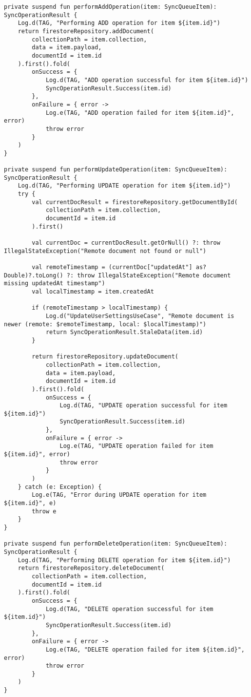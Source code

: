 \begin{lstlisting}[caption=Operazioni di Sincronizzazione, label=lst:sync_operations, basicstyle=\ttfamily\scriptsize, breaklines=true, breakatwhitespace=true, tabsize=4]
private suspend fun performAddOperation(item: SyncQueueItem): SyncOperationResult {
    Log.d(TAG, "Performing ADD operation for item ${item.id}")
    return firestoreRepository.addDocument(
        collectionPath = item.collection,
        data = item.payload,
        documentId = item.id
    ).first().fold(
        onSuccess = {
            Log.d(TAG, "ADD operation successful for item ${item.id}")
            SyncOperationResult.Success(item.id)
        },
        onFailure = { error ->
            Log.e(TAG, "ADD operation failed for item ${item.id}", error)
            throw error
        }
    )
}

private suspend fun performUpdateOperation(item: SyncQueueItem): SyncOperationResult {
    Log.d(TAG, "Performing UPDATE operation for item ${item.id}")
    try {
        val currentDocResult = firestoreRepository.getDocumentById(
            collectionPath = item.collection,
            documentId = item.id
        ).first()

        val currentDoc = currentDocResult.getOrNull() ?: throw IllegalStateException("Remote document not found or null")

        val remoteTimestamp = (currentDoc["updatedAt"] as? Double)?.toLong() ?: throw IllegalStateException("Remote document missing updatedAt timestamp")
        val localTimestamp = item.createdAt

        if (remoteTimestamp > localTimestamp) {
            Log.d("UpdateUserSettingsUseCase", "Remote document is newer (remote: $remoteTimestamp, local: $localTimestamp)")
            return SyncOperationResult.StaleData(item.id)
        }

        return firestoreRepository.updateDocument(
            collectionPath = item.collection,
            data = item.payload,
            documentId = item.id
        ).first().fold(
            onSuccess = {
                Log.d(TAG, "UPDATE operation successful for item ${item.id}")
                SyncOperationResult.Success(item.id)
            },
            onFailure = { error ->
                Log.e(TAG, "UPDATE operation failed for item ${item.id}", error)
                throw error
            }
        )
    } catch (e: Exception) {
        Log.e(TAG, "Error during UPDATE operation for item ${item.id}", e)
        throw e
    }
}

private suspend fun performDeleteOperation(item: SyncQueueItem): SyncOperationResult {
    Log.d(TAG, "Performing DELETE operation for item ${item.id}")
    return firestoreRepository.deleteDocument(
        collectionPath = item.collection,
        documentId = item.id
    ).first().fold(
        onSuccess = {
            Log.d(TAG, "DELETE operation successful for item ${item.id}")
            SyncOperationResult.Success(item.id)
        },
        onFailure = { error ->
            Log.e(TAG, "DELETE operation failed for item ${item.id}", error)
            throw error
        }
    )
}
\end{lstlisting}

